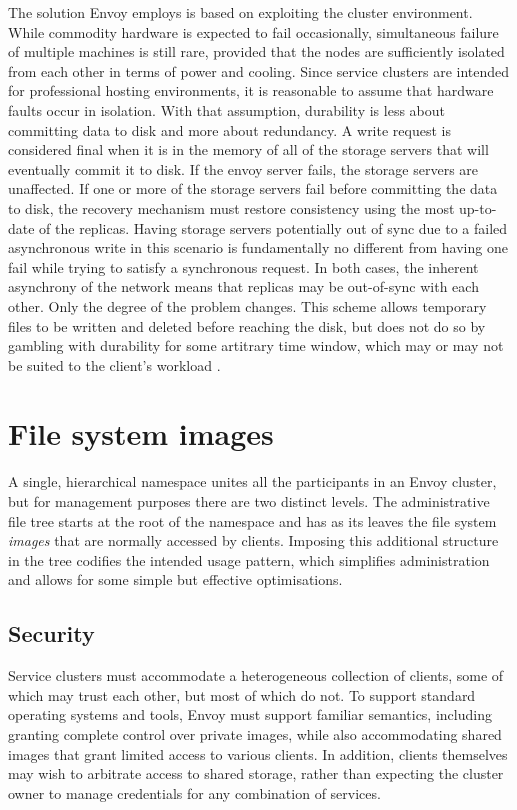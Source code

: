 The solution Envoy employs is based on exploiting the cluster environment. While commodity hardware is expected to fail occasionally, simultaneous failure of multiple machines is still rare, provided that the nodes are sufficiently isolated from each other in terms of power and cooling. Since service clusters are intended for professional hosting environments, it is reasonable to assume that hardware faults occur in isolation. With that assumption, durability is less about committing data to disk and more about redundancy. A write request is considered final when it is in the memory of all of the storage servers that will eventually commit it to disk. If the envoy server fails, the storage servers are unaffected. If one or more of the storage servers fail before committing the data to disk, the recovery mechanism must restore consistency using the most up-to-date of the replicas. Having storage servers potentially out of sync due to a failed asynchronous write in this scenario is fundamentally no different from having one fail while trying to satisfy a synchronous request. In both cases, the inherent asynchrony of the network means that replicas may be out-of-sync with each other. Only the degree of the problem changes. This scheme allows temporary files to be written and deleted before reaching the disk, but does not do so by gambling with durability for some artitrary time window, which may or may not be suited to the client's workload \cite{roselli}.

\section{File system images}

A single, hierarchical namespace unites all the participants in an Envoy cluster, but for management purposes there are two distinct levels. The administrative file tree starts at the root of the namespace and has as its leaves the file system \emph{images} that are normally accessed by clients. Imposing this additional structure in the tree codifies the intended usage pattern, which simplifies administration and allows for some simple but effective optimisations.

\subsection{Security}

Service clusters must accommodate a heterogeneous collection of clients, some of which may trust each other, but most of which do not. To support standard operating systems and tools, Envoy must support familiar semantics, including granting complete control over private images, while also accommodating shared images that grant limited access to various clients. In addition, clients themselves may wish to arbitrate access to shared storage, rather than expecting the cluster owner to manage credentials for any combination of services.

